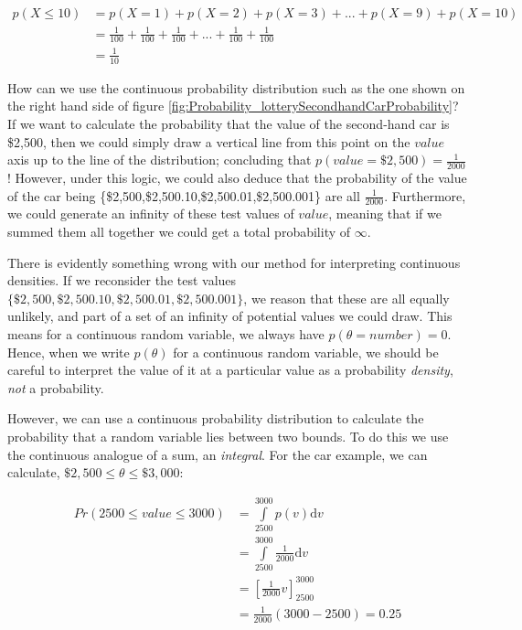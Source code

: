 \documentclass[11pt,fullpage]{book}
\begin{document}
\begin{equation}
\begin{align}
p(X\leq 10) &= p(X=1) + p(X=2) + p(X=3) + ... + p(X=9) + p(X=10)\\
&= \frac{1}{100} + \frac{1}{100} + \frac{1}{100} + ... + \frac{1}{100} + \frac{1}{100}\\
&= \frac{1}{10}
\end{align}
\end{equation}

How can we use the continuous probability distribution such as the one shown on the right hand side of figure \ref{fig:Probability_lotterySecondhandCarProbability}? If we want to calculate the probability that the value of the second-hand car is \$2,500, then we could simply draw a vertical line from this point on the $value$ axis up to the line of the distribution; concluding that $p(value=\$2,500) = \frac{1}{2000}$! However, under this logic, we could also deduce that the probability of the value of the car being \{\$2,500,\$2,500.10,\$2,500.01,\$2,500.001\} are all $\frac{1}{2000}$. Furthermore, we could generate an infinity of these test values of $value$, meaning that if we summed them all together we could get a total probability of $\infty$. 

There is evidently something wrong with our method for interpreting continuous densities. If we reconsider the test values $\{\$2,500,\$2,500.10,\$2,500.01,\$2,500.001\}$, we reason that these are all equally unlikely, and part of a set of an infinity of potential values we could draw. This means for a continuous random variable, we always have $p(\theta=number) = 0$. Hence, when we write $p(\theta)$ for a continuous random variable, we should be careful to interpret the value of it at a particular value as a probability \textit{density}, \textit{not} a probability. 

However, we can use a continuous probability distribution to calculate the probability that a random variable lies between two bounds. To do this we use the continuous analogue of a sum, an \textit{integral}. For the car example, we can calculate, $\$2,500\leq \theta \leq \$3,000$:

\begin{equation}\label{eq:Probability_continuousProbabilityIntervalExample}
\begin{align}
Pr(2500\leq value \leq 3000) &= \int\limits_{2500}^{3000} p(v) \mathrm{d}v\\
&= \int\limits_{2500}^{3000} \frac{1}{2000} \mathrm{d}v\\
&= \left[\frac{1}{2000}v\right]_{2500}^{3000}\\ 
&= \frac{1}{2000}(3000-2500) = 0.25
\end{align}
\end{equation}
\end{document}
